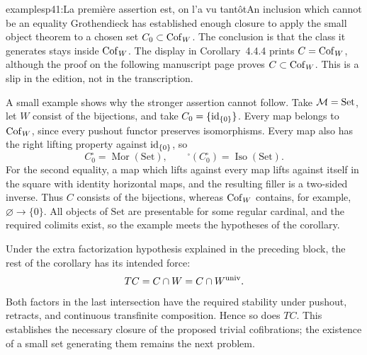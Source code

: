 \begin{dcomment}{examples}{p41:La première assertion est, on l'a vu tantôt}{An inclusion which cannot be an equality}
Grothendieck has established enough closure to apply the small object theorem to a chosen set $C_0\subset\mathrm{Cof}_W$. The conclusion is that the class it generates stays inside $\mathrm{Cof}_W$. The display in Corollary~4.4.4 prints $C=\mathrm{Cof}_W$, although the proof on the following manuscript page proves $C\subset\mathrm{Cof}_W$. This is a slip in the edition, not in the transcription.

A small example shows why the stronger assertion cannot follow. Take $\mathcal{M}=\mathrm{Set}$, let $W$ consist of the bijections, and take $C_0=\{\mathrm{id}_{\{0\}}\}$. Every map belongs to $\mathrm{Cof}_W$, since every pushout functor preserves isomorphisms. Every map also has the right lifting property against $\mathrm{id}_{\{0\}}$, so
\[
C_0^{\square}=\operatorname{Mor}(\mathrm{Set}),\qquad
{}^{\square}(C_0^{\square})=\operatorname{Iso}(\mathrm{Set}).
\]
For the second equality, a map which lifts against every map lifts against itself in the square with identity horizontal maps, and the resulting filler is a two-sided inverse. Thus $C$ consists of the bijections, whereas $\mathrm{Cof}_W$ contains, for example, $\varnothing\to\{0\}$. All objects of $\mathrm{Set}$ are presentable for some regular cardinal, and the required colimits exist, so the example meets the hypotheses of the corollary.

Under the extra factorization hypothesis explained in the preceding block, the rest of the corollary has its intended force:
\[
TC=C\cap W=C\cap W^{\mathrm{univ}}.
\]
Both factors in the last intersection have the required stability under pushout, retracts, and continuous transfinite composition. Hence so does $TC$. This establishes the necessary closure of the proposed trivial cofibrations; the existence of a small set generating them remains the next problem.
\end{dcomment}


